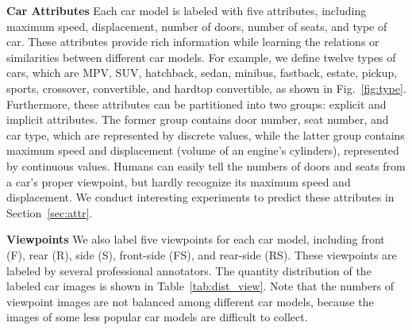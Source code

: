 \documentclass[10pt,twocolumn,letterpaper]{article}
\begin{document}
\textbf{Car Attributes}
Each car model is labeled with five attributes, including maximum speed, displacement, number of doors, number of seats, and type of car. These attributes provide rich information while learning the relations or similarities between different car models.
%
For example, we define twelve types of cars, which are MPV, SUV, hatchback, sedan, minibus, fastback, estate, pickup, sports, crossover, convertible, and hardtop convertible, as shown in Fig.~\ref{fig:type}.
%
Furthermore, these attributes can be partitioned into two groups: explicit and implicit attributes. The former group contains door number, seat number, and car type, which are represented by discrete values, while the latter group contains maximum speed and displacement (volume of an engine's cylinders), represented by continuous values.
%
Humans can easily tell the numbers of doors and seats from a car's proper viewpoint, but hardly recognize its maximum speed and displacement.
%
We conduct interesting experiments to predict these attributes in Section~\ref{sec:attr}.


%
%

\textbf{Viewpoints}
We also label five viewpoints for each car model, including front (F), rear (R), side (S), front-side (FS), and rear-side (RS). These viewpoints are labeled by several professional annotators. The quantity distribution of the labeled car images is shown in Table~\ref{tab:dist_view}.
%
Note that the numbers of viewpoint images are not balanced among different car models, because the images of some less popular car models are difficult to collect.

\end{document}

